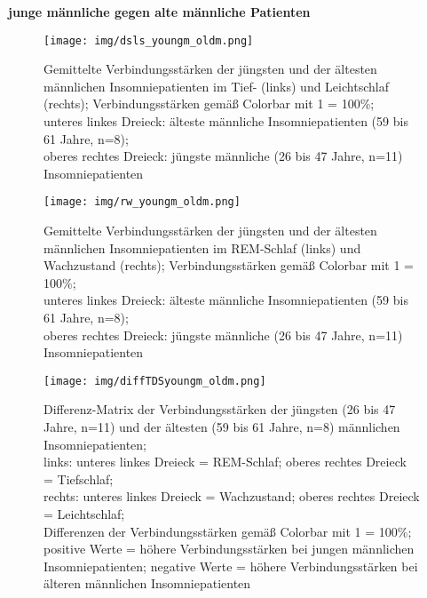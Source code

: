 \textbf{junge männliche gegen alte männliche Patienten}



\begin{figure}[H]
	\centering
	\texttt{[image: img/dsls\_youngm\_oldm.png]}
	\caption[Verbindungsstärken der jüngsten und der ältesten männlichen Insomniepatienten im Tief- und Leichtschlaf]{Gemittelte Verbindungsstärken der jüngsten und der ältesten männlichen Insomniepatienten im Tief- (links) und Leichtschlaf (rechts); Verbindungsstärken gemäß Colorbar mit 1 = 100\%;\\unteres linkes Dreieck: älteste männliche Insomniepatienten (59 bis 61 Jahre, n=8);\\oberes rechtes Dreieck: jüngste männliche (26 bis 47 Jahre, n=11) Insomniepatienten}
	\label{fig:dsls_youngm_oldm}
\end{figure}

\begin{figure}[H]
	\centering
	\texttt{[image: img/rw\_youngm\_oldm.png]}
	\caption[Verbindungsstärken der jüngsten und der ältesten männlichen Insomniepatienten im REM-Schlaf und Wachzustand]{Gemittelte Verbindungsstärken der jüngsten und der ältesten männlichen Insomniepatienten im REM-Schlaf (links) und Wachzustand (rechts); Verbindungsstärken gemäß Colorbar mit 1 = 100\%;\\unteres linkes Dreieck: älteste männliche Insomniepatienten (59 bis 61 Jahre, n=8);\\oberes rechtes Dreieck: jüngste männliche (26 bis 47 Jahre, n=11) Insomniepatienten}
	\label{fig:rw_youngm_oldm}
\end{figure}

\begin{figure}[H]
	\centering
	\texttt{[image: img/diffTDSyoungm\_oldm.png]}
	\caption[Differenz-Matrix der Verbindungsstärken der jüngsten und ältesten männlichen Insomniepatienten]{Differenz-Matrix der Verbindungsstärken der jüngsten (26 bis 47 Jahre, n=11) und der ältesten (59 bis 61 Jahre, n=8) männlichen Insomniepatienten;\\links: unteres linkes Dreieck = REM-Schlaf; oberes rechtes Dreieck = Tiefschlaf;\\rechts: unteres linkes Dreieck = Wachzustand; oberes rechtes Dreieck = Leichtschlaf;\\Differenzen der Verbindungsstärken gemäß Colorbar mit 1 = 100\%;\\positive Werte = höhere Verbindungsstärken bei jungen männlichen Insomniepatienten; negative Werte = höhere Verbindungsstärken bei älteren männlichen Insomniepatienten}
	\label{fig:diffTDSyoungm_oldm}
\end{figure}



